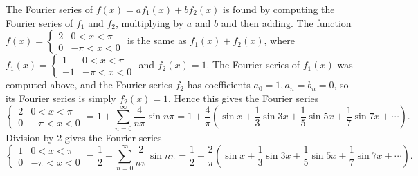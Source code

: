 The Fourier series of $f(x)=af_1(x)+bf_2(x)$ is found by computing the Fourier series of $f_1$ and $f_2$, multiplying by $a$ and $b$ and then adding.  The function $f(x) =\begin{cases}2&0<x<\pi\\0&-\pi<x<0\end{cases}$ is the same as $f_1(x) +f_2(x)$, where $f_1(x) = \begin{cases}1&0<x<\pi\\-1&-\pi<x<0\end{cases}$ and $f_2(x) = 1$.  The Fourier series of $f_1(x)$ was computed above, and the Fourier series $f_2$ has coefficients $a_0=1,a_n=b_n=0$, so its Fourier series is simply $f_2(x) = 1 $.  Hence this gives the Fourier series $$\begin{cases}2&0<x<\pi\\0&-\pi<x<0\end{cases}=1+\sum_{n=0}^\infty \frac{4}{n\pi}\sin n\pi = 1+\frac{4}{\pi}\left(\sin x + \frac{1}{3}\sin 3x + \frac{1}{5}\sin 5 x + \frac{1}{7}\sin 7x +\cdots\right).$$ 
Division by 2 gives the Fourier series  $$\begin{cases}1&0<x<\pi\\0&-\pi<x<0\end{cases}=\frac12+\sum_{n=0}^\infty \frac{2}{n\pi}\sin n\pi = \frac12+\frac{2}{\pi}\left(\sin x + \frac{1}{3}\sin 3x + \frac{1}{5}\sin 5 x + \frac{1}{7}\sin 7x +\cdots\right).$$


